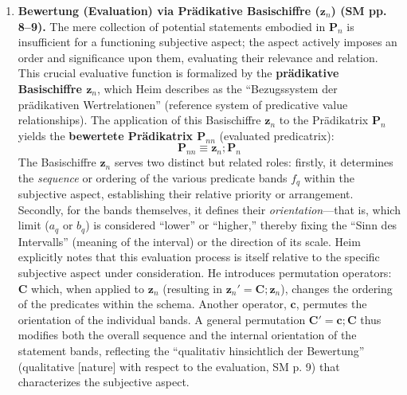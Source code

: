 \documentclass[12pt]{article}
\newcommand{\q}[1]{\enquote{#1}}
\begin{document}
\begin{enumerate}
    \item \textbf{Bewertung (Evaluation) via Prädikative Basischiffre (\( \mathbf{z}_n \)) (SM pp. 8--9).}
    The mere collection of potential statements embodied in \( \mathbf{P}_n \) is insufficient for a functioning subjective aspect; the aspect actively imposes an order and significance upon them, evaluating their relevance and relation. This crucial evaluative function is formalized by the \textbf{prädikative Basischiffre \( \mathbf{z}_n \)}, which Heim describes as the \q{Bezugssystem der prädikativen Wertrelationen} (reference system of predicative value relationships). The application of this Basischiffre \( \mathbf{z}_n \) to the Prädikatrix \( \mathbf{P}_n \) yields the \textbf{bewertete Prädikatrix \( \mathbf{P}_{nn} \)} (evaluated predicatrix): 
    \begin{equation*}
    \mathbf{P}_{nn} \equiv \mathbf{z}_n ; \mathbf{P}_n
    \end{equation*}
    The Basischiffre \( \mathbf{z}_n \) serves two distinct but related roles: firstly, it determines the \textit{sequence} or ordering of the various predicate bands \( f_q \) within the subjective aspect, establishing their relative priority or arrangement. Secondly, for the bands themselves, it defines their \textit{orientation}—that is, which limit (\( a_q \) or \( b_q \)) is considered \q{lower} or \q{higher,} thereby fixing the \q{Sinn des Intervalls} (meaning of the interval) or the direction of its scale. Heim explicitly notes that this evaluation process is itself relative to the specific subjective aspect under consideration. He introduces permutation operators: \( \mathbf{C} \) which, when applied to \( \mathbf{z}_n \) (resulting in \( \mathbf{z}_n' = \mathbf{C};\mathbf{z}_n \)), changes the ordering of the predicates within the schema. Another operator, \( \mathbf{c} \), permutes the orientation of the individual bands. A general permutation \( \mathbf{C}' = \mathbf{c};\mathbf{C} \) thus modifies both the overall sequence and the internal orientation of the statement bands, reflecting the \q{qualitativ hinsichtlich der Bewertung} (qualitative [nature] with respect to the evaluation, SM p. 9) that characterizes the subjective aspect.


\end{enumerate}
\end{document}
